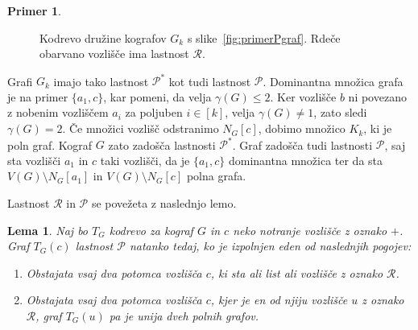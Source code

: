 \documentclass[12pt,a4paper,twoside]{article}
\theoremstyle{definition} %
\newtheorem{primer}[definicija]{Primer}
\theoremstyle{plain} %
\newtheorem{lema}[definicija]{Lema}
\numberwithin{equation}{section}  %
\begin{document}
\begin{primer}
\begin{figure}[h]
\caption{Kodrevo družine kografov $G_k$ s slike~\ref{fig:primerPgraf}. Rdeče obarvano vozlišče ima lastnost $\mathcal{R}$.}
\label{fig:primerPdrevo}
\end{figure}

Grafi $G_k$ imajo tako lastnost $\mathcal{P^*}$ kot tudi lastnost $\mathcal{P}$. Dominantna množica grafa je na primer $\{a_1, c\}$, kar pomeni, da velja $\gamma(G) \leq 2$. Ker vozlišče $b$ ni povezano z nobenim vozliščem $a_i$ za poljuben $i \in [k]$, velja $\gamma(G) \neq 1$, zato sledi $\gamma(G) = 2$. Če množici vozlišč odstranimo $N_G[c]$, dobimo množico $K_k$, ki je poln graf. Kograf $G$ zato zadošča lastnosti  $\mathcal{P^*}$. 
Graf zadošča tudi lastnosti $\mathcal{P}$, saj sta vozlišči $a_1$ in $c$ taki vozlišči, da je $\{a_1, c\}$ dominantna množica ter da sta $V(G) \setminus N_G[a_1]$  in $V(G) \setminus N_G[c]$ polna grafa.
\end{primer}


Lastnost $\mathcal{R}$ in $\mathcal{P}$ se povežeta z naslednjo lemo.

\begin{lema}\label{Lema2} Naj bo $T_G$ kodrevo za kograf $G$ in $c$ neko notranje vozlišče z oznako $+$. Graf $T_G(c)$ lastnost $\mathcal{P}$ natanko tedaj, ko je izpolnjen eden od naslednjih pogojev:
\begin{enumerate}[label=($\roman*$)]
\item Obstajata vsaj dva potomca vozlišča $c$, ki sta ali list ali vozlišče z oznako $\mathcal{R}$.
\item Obstajata vsaj dva potomca vozlišča $c$, kjer je en od njiju vozlišče $u$ z oznako $\mathcal{R}$, graf $T_G(u)$ pa je unija dveh polnih grafov.
\end{enumerate}
\end{lema}
\end{document}
